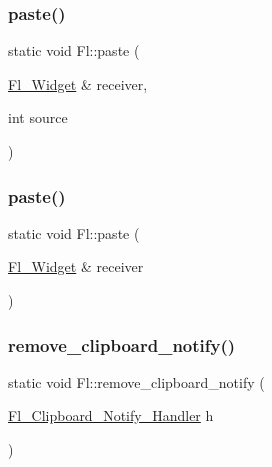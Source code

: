 \subsubsection{\texorpdfstring{paste()}{paste()}\hspace{0.1cm}{\footnotesize\ttfamily [2/3]}}
{\footnotesize\ttfamily static void Fl\+::paste (\begin{DoxyParamCaption}\item[{\hyperlink{class_fl___widget}{Fl\+\_\+\+Widget} \&}]{receiver,  }\item[{int}]{source }\end{DoxyParamCaption})\hspace{0.3cm}{\ttfamily [static]}}

\mbox{\label{group__fl__clipboard_ga941286738083a632b155a132a3a28716}} 
\subsubsection{\texorpdfstring{paste()}{paste()}\hspace{0.1cm}{\footnotesize\ttfamily [3/3]}}
{\footnotesize\ttfamily static void Fl\+::paste (\begin{DoxyParamCaption}\item[{\hyperlink{class_fl___widget}{Fl\+\_\+\+Widget} \&}]{receiver }\end{DoxyParamCaption})\hspace{0.3cm}{\ttfamily [static]}}

\mbox{\label{group__fl__clipboard_ga89d76c03f4fc6669910b7347b71e1762}} 
\subsubsection{\texorpdfstring{remove\+\_\+clipboard\+\_\+notify()}{remove\_clipboard\_notify()}}
{\footnotesize\ttfamily static void Fl\+::remove\+\_\+clipboard\+\_\+notify (\begin{DoxyParamCaption}\item[{\hyperlink{group__callback__functions_gae5e26cbad23960ff7ce4d50d82c74750}{Fl\+\_\+\+Clipboard\+\_\+\+Notify\+\_\+\+Handler}}]{h }\end{DoxyParamCaption})\hspace{0.3cm}{\ttfamily [static]}}

